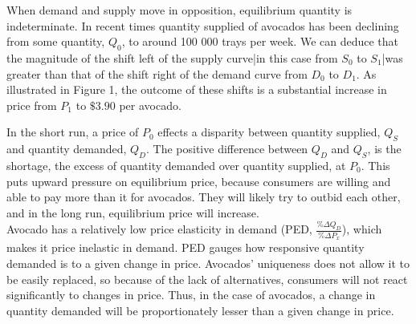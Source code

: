 \documentclass[12pt]{article}
\begin{document}
\begin{center}
\end{center} 
	
	When demand and supply move in opposition, equilibrium quantity is indeterminate. In recent times quantity supplied of avocados has been declining from some quantity, $Q_0$, to around 100 000 trays per week. We can deduce that the magnitude of the shift left of the supply curve|in this case from $S_0$ to $S_1$|was greater than that of the shift right of the demand curve from $D_0$ to $D_1$. As illustrated in Figure 1, the outcome of these shifts is a substantial increase in price from $P_1$ to $\$3.90$ per avocado. %
	
	In the short run, a price of $P_0$ effects a disparity between quantity supplied, $Q_S$ and quantity demanded, $Q_D$. The positive difference between $Q_D$ and $Q_S$, is the shortage, the excess of quantity demanded over quantity supplied, at $P_0$. This puts upward pressure on equilibrium price, because consumers are willing and able to pay more than it for avocados. They will likely try to outbid each other, and in the long run, equilibrium price will increase. \\
	
	 Avocado has a relatively low price elasticity in demand (PED, $\frac{\% \Delta Q_D}{\% \Delta P_x}$), which makes it price inelastic in demand. PED gauges how responsive quantity demanded is to a given change in price. Avocados' uniqueness does not allow it to be easily replaced, so because of the lack of alternatives, consumers will not react significantly to changes in price. Thus, in the case of avocados, a change in quantity demanded will be proportionately lesser than a given change in price. \\
	 
\end{document}
